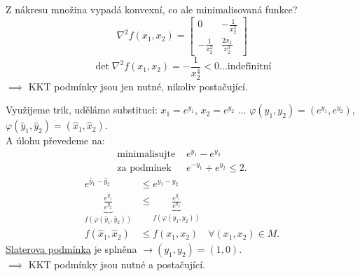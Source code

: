\begin{multicols}{2}

\columnbreak

    Z nákresu množina vypadá konvexní, co ale minimalisovaná funkce?
    \[
        \nabla^2 f(x_1, x_2) = 
        \begin{bmatrix}
            0 & -\frac{1}{x^2_2} \\
            -\frac{1}{x^2_2} & \frac{2x_1}{x^3_2}    
        \end{bmatrix}
    \]
    \[
        \det \nabla^2 f(x_1, x_2) = -\frac{1}{x^4_2} < 0 \dots \text{indefinitní}
    \]
    $\implies$ KKT podmínky jsou jen nutné, nikoliv postačující.
\end{multicols}
Využijeme trik, uděláme substituci: $x_1 = e^{y_1}$, $x_2 = e^{y_2}$ $\dots$ $\varphi(y_1, y_2) = (e^{y_1}, e^{y_2})$,
$\varphi(\hat y_1, \hat y_2) = (\hat x_1, \hat x_2)$.\\
A úlohu převedeme na:
\begin{align*}
    \text{minimalisujte } &e^{y_1} - e^{y_2}\\
    \text{za podmínek } &e^{-y_1} + e^{y_2} \leq 2.
\end{align*}
\begin{align*}
    e^{\hat y_1 - \hat y_2} &\leq e^{y_1 - y_2} \\
    \underbrace{\frac{e^{\hat y_1}}{e^{\hat y_2}}}_{f(\varphi(\hat y_1, \hat y_2))} &\leq 
    \underbrace{\frac{e^{y_1}}{e^{y_2}}}_{f(\varphi(y_1, y_2))} \\
    f(\hat x_1, \hat x_2) &\leq f(x_1, x_2) \quad \forall (x_1, x_2) \in M.
\end{align*}
\hyperref[slaterPodm]{Slaterova podmínka} je splněna $\rightarrow (y_1, y_2) = (1, 0)$.\\
$\implies$ KKT podmínky jsou nutné a postačující.
